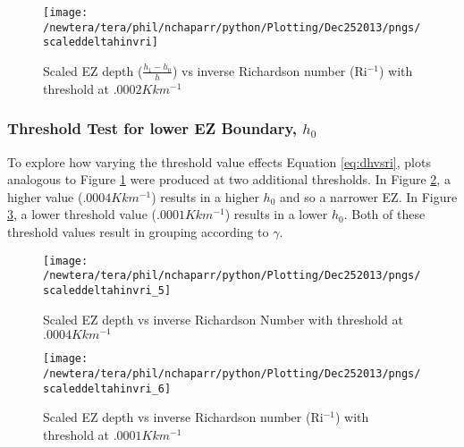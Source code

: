 \begin{figure}[htbp]
\centering
 \texttt{[image: /newtera/tera/phil/nchaparr/python/Plotting/Dec252013/pngs/scaleddeltahinvri]}
       
        \caption{Scaled EZ depth ($\frac{h_{1}-h_{0}}{h}$) vs inverse Richardson number (\acs{Ri}$^{-1}$) with threshold at $.0002Kkm^{-1}$}
         \label{fig:scaledeltahinvri}
\end{figure}

\clearpage
\subsubsection{Threshold Test for lower \acs{EZ} Boundary, $h_{0}$}
To explore how varying the threshold value effects Equation \ref{eq:dhvsri}, plots analogous to Figure \ref{fig:scaledeltahinvri} were produced at two 
additional thresholds.  In Figure \ref{fig:scaledeltahinvri1}, a higher value ($.0004Kkm^{-1}$) results in a higher $h_{0}$   
and so a narrower \acs{EZ}.
In Figure \ref{fig:scaledeltahinvri2}, a lower threshold value ($.0001Kkm^{-1}$) results in a lower $h_{0}$.  Both of these threshold values result in grouping according to $\gamma$.\\

\begin{figure}[htbp]
    \centering
    \texttt{[image: /newtera/tera/phil/nchaparr/python/Plotting/Dec252013/pngs/scaleddeltahinvri\_5]}
    \caption{Scaled EZ depth vs inverse Richardson Number with threshold at $.0004Kkm^{-1}$}
    \label{fig:scaledeltahinvri1}   %
\end{figure}

\begin{figure}[htbp]
    \centering
    \texttt{[image: /newtera/tera/phil/nchaparr/python/Plotting/Dec252013/pngs/scaleddeltahinvri\_6]}
    \caption{Scaled EZ depth vs inverse Richardson number (\acs{Ri}$^{-1}$) with threshold at $.0001Kkm^{-1}$}
    \label{fig:scaledeltahinvri2}   %
\end{figure}

